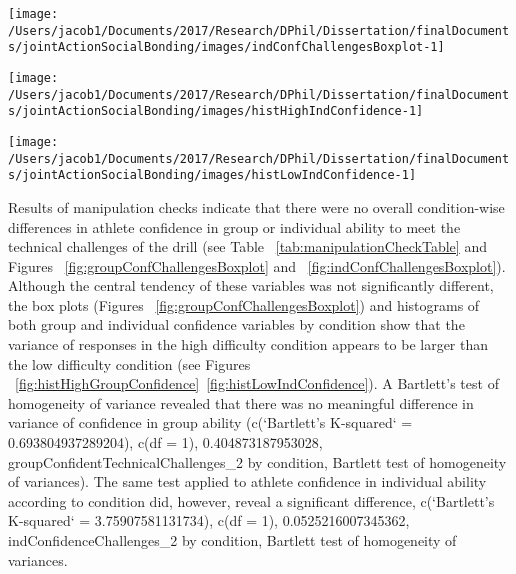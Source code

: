 \documentclass[english]{article}\usepackage[]{graphicx}\usepackage[]{color}
\makeatletter
\def\maxwidth{ %
  \ifdim\Gin@nat@width>\linewidth
    \linewidth
  \else
    \Gin@nat@width
  \fi
}
\newenvironment{knitrout}{}{} %
\makeatother
\begin{document}
\begin{knitrout}
\color{fgcolor}

{\centering \texttt{[image: /Users/jacob1/Documents/2017/Research/DPhil/Dissertation/finalDocuments/jointActionSocialBonding/images/indConfChallengesBoxplot-1]} 

}



\end{knitrout}

\begin{knitrout}
\color{fgcolor}

{\centering \texttt{[image: /Users/jacob1/Documents/2017/Research/DPhil/Dissertation/finalDocuments/jointActionSocialBonding/images/histHighIndConfidence-1]} 

}



\end{knitrout}

\begin{knitrout}
\color{fgcolor}

{\centering \texttt{[image: /Users/jacob1/Documents/2017/Research/DPhil/Dissertation/finalDocuments/jointActionSocialBonding/images/histLowIndConfidence-1]} 

}



\end{knitrout}









Results of manipulation checks indicate that there were no overall condition-wise differences in athlete confidence in group or individual ability to meet the technical challenges of the drill (see Table ~\ref{tab:manipulationCheckTable} and Figures ~\ref{fig:groupConfChallengesBoxplot} and ~\ref{fig:indConfChallengesBoxplot}).
Although the central tendency of these variables was not significantly different, the box plots (Figures ~\ref{fig:groupConfChallengesBoxplot}) and histograms of both group and individual confidence variables by condition show that the variance of responses in the high difficulty condition appears to be larger than the low difficulty condition (see Figures ~\ref{fig:histHighGroupConfidence}\nobreakdash~\ref{fig:histLowIndConfidence}).
A Bartlett's test of homogeneity of variance revealed that there was no meaningful difference in variance of confidence in group ability (c(`Bartlett's K-squared` = 0.693804937289204), c(df = 1), 0.404873187953028, groupConfidentTechnicalChallenges_2 by condition, Bartlett test of homogeneity of variances). The same test applied to athlete confidence in individual ability according to condition did, however, reveal a significant difference, c(`Bartlett's K-squared` = 3.75907581131734), c(df = 1), 0.0525216007345362, indConfidenceChallenges_2 by condition, Bartlett test of homogeneity of variances.
\end{document}
